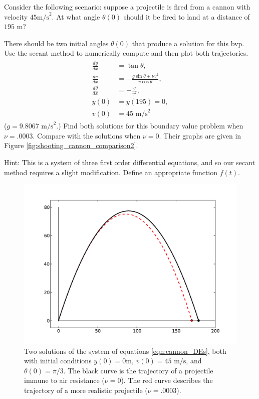 \begin{problem}
Consider the following scenario: suppose a projectile is fired from a cannon with velocity $45\text{m/s}^2$.
At what angle $\theta(0)$ should it be fired to land at a distance of $195\text{ m}$? 

There should be two initial angles $\theta(0)$ that produce a solution for this bvp.
Use the secant method to numerically compute and then plot both trajectories.
\begin{align}
	\label{eqn:cannon_shooting}
	\begin{split}
\frac{dy}{dx} &= \tan {\theta} ,\\
\frac{dv}{dx} &= -\frac{g \sin{\theta} + \nu v^2}{v \cos{\theta}},\\
\frac{d\theta}{dx} &= -\frac{g}{v^2},\\
y(0)&= y(195) = 0,\\
v(0) &= 45 \text{ m/s}^2
	\end{split}
\end{align}
($g = 9.8067\text{ m/s}^2$.)
Find both solutions for this boundary value problem when $\nu = .0003$.
Compare with the solutions when $\nu = 0.$
Their graphs are given in Figure \eqref{fig:shooting_cannon_comparison2}.

Hint: This is a system of three first order differential equations, and so our secant method requires a slight modification.
Define an appropriate function $f(t)$. 
\end{problem}

\begin{figure}[ht]
\centering
\includegraphics[width=\textwidth]{Cannon_with_AirResistance.pdf}
\caption{Two solutions of the system of equations \eqref{eqn:cannon_DEs}, both with initial conditions  $y(0) = 0 \text{m}$, $ v(0) = 45 \text{ m/s}$, and $\theta(0)=\pi/3$.
The black curve is the trajectory of a projectile immune to air resistance ($\nu = 0$).
The red curve describes the trajectory of a more realistic projectile ($\nu = .0003$).}
\label{fig:shooting_cannon_comparison1}
\end{figure}

